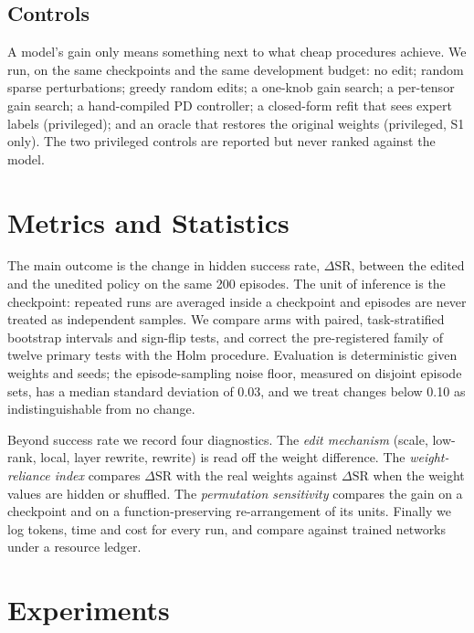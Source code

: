 \documentclass[conference]{IEEEtran}
\begin{document}
\subsection{Controls}
A model's gain only means something next to what cheap procedures achieve. We run, on the same checkpoints and the same development budget: no edit; random sparse perturbations; greedy random edits; a one-knob gain search; a per-tensor gain search; a hand-compiled PD controller; a closed-form refit that sees expert labels (privileged); and an oracle that restores the original weights (privileged, S1 only). The two privileged controls are reported but never ranked against the model.

\section{Metrics and Statistics}
The main outcome is the change in hidden success rate, $\Delta\mathrm{SR}$, between the edited and the unedited policy on the same 200 episodes. The unit of inference is the checkpoint: repeated runs are averaged inside a checkpoint and episodes are never treated as independent samples. We compare arms with paired, task-stratified bootstrap intervals and sign-flip tests, and correct the pre-registered family of twelve primary tests with the Holm procedure. Evaluation is deterministic given weights and seeds; the episode-sampling noise floor, measured on disjoint episode sets, has a median standard deviation of 0.03, and we treat changes below 0.10 as indistinguishable from no change.

Beyond success rate we record four diagnostics. The \emph{edit mechanism} (scale, low-rank, local, layer rewrite, rewrite) is read off the weight difference. The \emph{weight-reliance index} compares $\Delta\mathrm{SR}$ with the real weights against $\Delta\mathrm{SR}$ when the weight values are hidden or shuffled. The \emph{permutation sensitivity} compares the gain on a checkpoint and on a function-preserving re-arrangement of its units. Finally we log tokens, time and cost for every run, and compare against trained networks under a resource ledger.

\section{Experiments}
\end{document}
